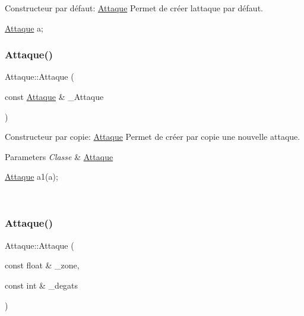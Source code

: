 Constructeur par défaut\+: \hyperlink{classAttaque}{Attaque} Permet de créer l\textquotesingle{}attaque par défaut. 


\begin{DoxyCode}
\hyperlink{classAttaque}{Attaque} a;
\end{DoxyCode}
 \mbox{\label{classAttaque_a1a6b78c3649a5860530da68f9c6bbfbf}} 
\subsubsection{\texorpdfstring{Attaque()}{Attaque()}\hspace{0.1cm}{\footnotesize\ttfamily [2/3]}}
{\footnotesize\ttfamily Attaque\+::\+Attaque (\begin{DoxyParamCaption}\item[{const \hyperlink{classAttaque}{Attaque} \&}]{\+\_\+\+Attaque }\end{DoxyParamCaption})}



Constructeur par copie\+: \hyperlink{classAttaque}{Attaque} Permet de créer par copie une nouvelle attaque. 


\begin{DoxyParams}{Parameters}
{\em Classe} & \hyperlink{classAttaque}{Attaque} 
\begin{DoxyCode}
\hyperlink{classAttaque}{Attaque} a1(a);
\end{DoxyCode}
 \\
\hline
\end{DoxyParams}
\mbox{\label{classAttaque_a103553de7b33d7f8682f9beaa51d878a}} 
\subsubsection{\texorpdfstring{Attaque()}{Attaque()}\hspace{0.1cm}{\footnotesize\ttfamily [3/3]}}
{\footnotesize\ttfamily Attaque\+::\+Attaque (\begin{DoxyParamCaption}\item[{const float \&}]{\+\_\+zone,  }\item[{const int \&}]{\+\_\+degats }\end{DoxyParamCaption})}



